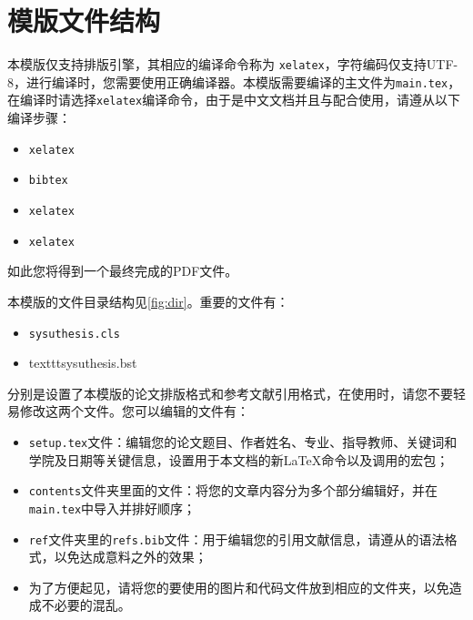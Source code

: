 \section{模版文件结构}

本模版仅支持排版引擎，其相应的编译命令称为 \texttt{xelatex}，字符编码仅支持UTF-8，进行编译时，您需要使用正确编译器。本模版需要编译的主文件为\texttt{main.tex}，在编译时请选择\texttt{xelatex}编译命令，由于是中文文档并且与配合使用，请遵从以下编译步骤：
\begin{itemize}
    \item \texttt{xelatex}
    \item \texttt{bibtex}
    \item \texttt{xelatex}
    \item \texttt{xelatex}
\end{itemize}
如此您将得到一个最终完成的PDF文件。

本模版的文件目录结构见\ref{fig:dir}。重要的文件有：
\begin{itemize}
    \item \texttt{sysuthesis.cls}
    \item texttt{sysuthesis.bst}
\end{itemize}
分别是设置了本模版的论文排版格式和参考文献引用格式，在使用时，请您不要轻易修改这两个文件。您可以编辑的文件有：
\begin{itemize}
    \item \texttt{setup.tex}文件：编辑您的论文题目、作者姓名、专业、指导教师、关键词和学院及日期等关键信息，设置用于本文档的新\LaTeX{}命令以及调用的宏包；
    \item \texttt{contents}文件夹里面的文件：将您的文章内容分为多个部分编辑好，并在\texttt{main.tex}中导入并排好顺序；
    \item \texttt{ref}文件夹里的\texttt{refs.bib}文件：用于编辑您的引用文献信息，请遵从的语法格式，以免达成意料之外的效果；
    \item 为了方便起见，请将您的要使用的图片和代码文件放到相应的文件夹，以免造成不必要的混乱。
\end{itemize}

